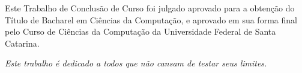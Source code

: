 \documentclass[
    12pt,       %
    openright,      %
    twoside,      %
    a4paper,      %
    english,      %
    french,       %
    spanish,      %
    brazil,       %
    ]{abntex2}
\begin{document}
  \begin{folhadeaprovacao}

    \begin{center}
      {\ABNTEXchapterfont\large\imprimirautor}

      \vspace*{\fill}\vspace*{\fill}
      {\ABNTEXchapterfont\bfseries\Large\imprimirtitulo}
      \vspace*{\fill}


      \vspace*{\fill}
     \end{center}

     Este Trabalho de Conclusão de Curso foi julgado aprovado para a
     obtenção do Título de Bacharel em Ciências da Computação, e
     aprovado em sua forma final pelo Curso de Ciências da Computação
     da Universidade Federal de Santa Catarina.


     \begin{center}
      \vspace*{0.5cm}
      {\large\imprimirlocal}
      \par
      {\large\imprimirdata}
      \vspace*{1cm}
    \end{center}

  \end{folhadeaprovacao}

  \begin{dedicatoria}
     \vspace*{\fill}
     \centering
     \noindent
     \textit{ Este trabalho é dedicado a
     todos que não cansam de testar seus
     limites.} \vspace*{\fill}
  \end{dedicatoria}
\end{document}
